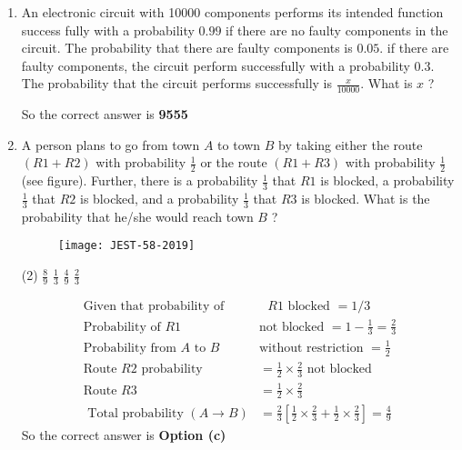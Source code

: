 \begin{enumerate}
\begin{answer}
\begin{align*}
	&{ }^{100} C_{n}\left(\frac{1}{2}\right)^{n}\left(\frac{1}{2}\right)^{100-n}
\intertext{	Hence, the probability that same number of heads occur for both coins at the end of experiment is}
&\sum_{n=0}^{100}\left({ }^{100} C_{n}\left(\frac{1}{2}\right)^{100}\right) \cdot\left({ }^{100} C_{n}\left(\frac{1}{2}\right)^{100}\right)=\sum_{n=1}^{100}\left({ }^{100} C_{n}\right)^{2}\left(\frac{1}{2}\right)^{200}=\left(\frac{1}{4}\right)^{100} \sum_{n=1}^{100}\left({ }^{100} C_{n}\right)^{2}
	\end{align*}
		So the correct answer is \textbf{Option (d)}
\end{answer}
\item An electronic circuit with 10000 components performs its intended function success fully with a probability $0.99$ if there are no faulty components in the circuit. The probability that there are faulty components is $0.05$. if there are faulty components, the circuit perform successfully with a probability $0.3$. The probability that the circuit performs successfully is $\frac{x}{10000}$. What is $x$ ?
{}
\begin{answer}
So the correct answer is  \textbf{9555}
\end{answer}
\item A person plans to go from town $A$ to town $B$ by taking either the route $(R 1+R 2)$ with probability $\frac{1}{2}$ or the route $(R 1+R 3)$ with probability $\frac{1}{2}$ (see figure). Further, there is a probability $\frac{1}{3}$ that $R 1$ is blocked, a probability $\frac{1}{3}$ that $R 2$ is blocked, and a probability $\frac{1}{3}$ that $R 3$ is blocked. What is the probability that he/she would reach town $B$ ?
{}
\begin{figure}[H]
	\centering
	\texttt{[image: JEST-58-2019]}
\end{figure}
 \begin{tasks}(2)
	\task[\textbf{a.}]$\frac{8}{9}$
	\task[\textbf{b.}]$\frac{1}{3}$
	\task[\textbf{c.}]$\frac{4}{9}$
	\task[\textbf{d.}]$\frac{2}{3}$
\end{tasks}
\begin{answer}
	\begin{align*}
	\text{Given that probability of}&\text{ $R 1$ blocked }=1 / 3\\
	\text{Probability of $R 1$ }&\text{not blocked }=1-\frac{1}{3}=\frac{2}{3}\\
	\text{Probability from $A$ to $B$ }&\text{without restriction }=\frac{1}{2}\\
	\text{Route $R 2$ probability }&=\frac{1}{2} \times \frac{2}{3}\text{ not blocked}\\
	\text{Route }R 3&=\frac{1}{2} \times \frac{2}{3}\\
\text{	Total probability }(A \rightarrow B)&=\frac{2}{3}\left[\frac{1}{2} \times \frac{2}{3}+\frac{1}{2} \times \frac{2}{3}\right]=\frac{4}{9}
	\end{align*}
	So the correct answer is \textbf{Option (c)}
\end{answer}

\end{enumerate}